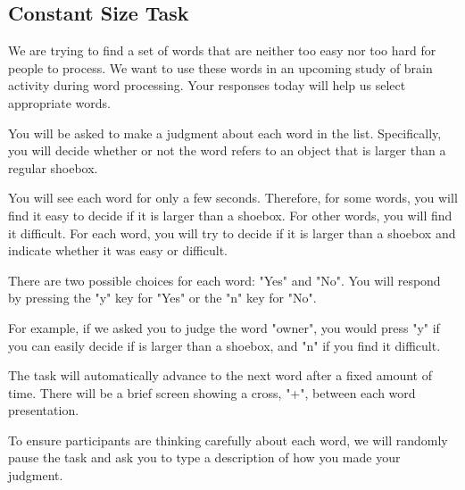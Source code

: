 \documentclass[man,natbib,floatsintext]{apa6} %
\begin{document}
\subsection{Constant Size Task}
\begin{displayquote}
We are trying to find a set of words that are neither too easy nor too hard for people to process. We want to use these words in an upcoming study of brain activity during word processing. Your responses today will help us select appropriate words.

     You will be asked to make a judgment about each word in the list.
       Specifically, you will decide whether or not the word refers to an object that is larger than a regular shoebox.

       You will see each word for only a few seconds. Therefore, for some words, you will find it easy to
           decide if it is larger than a shoebox. For other words, you will find it difficult.
           For each word, you will try to decide if it is larger than a shoebox and indicate whether it was easy or difficult.

      There are two possible choices for each word: "Yes" and "No". You will respond by pressing
      the "y" key for "Yes" or the "n" key for "No".

      For example, if we asked you to judge the word "owner", you would press "y" if you can easily decide
          if is larger than a shoebox, and "n" if you find it difficult.

      The task will automatically advance to the next word after a fixed amount of time.
      There will be a brief screen showing a cross, "+", between each word presentation.

      To ensure participants are thinking carefully about each word, we will
          randomly pause the task and ask you to type a description of how you made your judgment.
\end{displayquote}
\end{document}
